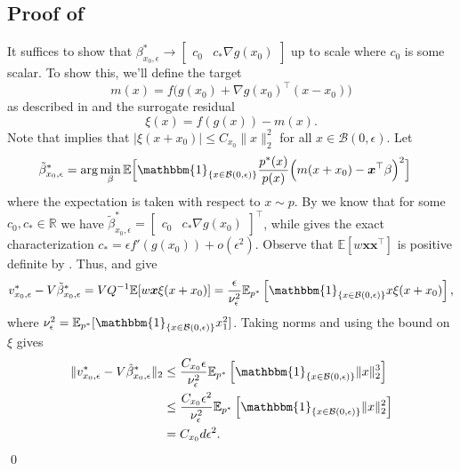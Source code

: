 \documentclass[11pt]{article}
\begin{document}
\begin{appendices}
\subsection{Proof of } \label{sec: proof of population vel prop}
It suffices to show that $\beta^*_{x_0, \epsilon} \rightarrow  \begin{bmatrix}c_0 &  c_*\nabla g(x_0)\end{bmatrix}$ up to scale where $c_0$ is some scalar. To show this, we'll define the  target  
\[m(x) = f\Big(g(x_0) + \nabla g(x_0)^{\top}(x-x_0)\Big)\]
as described in  and the surrogate residual 
\[\xi(x) = f(g(x)) - m(x).\] Note that  implies that $ |\xi(x+x_0)| \leq C_{x_0}\|x\|_2^2$ for all $x\in\mathcal{B}(0,\epsilon)$. Let  
\begin{align}
    \tilde{\beta}^*_{x_0, \epsilon} &= \arg\min_{\beta}\mathbb{E}\Big[\mathbbm{1}_{\{x \in \mathcal{B}(0, \epsilon)\}}\frac{p^*(x)}{p(x)}\Big(m(x+x_0) - \boldsymbol{x}^{\top}\beta\Big)^2\Big] \label{eq: perturbed pop estimator}
\end{align}
where the expectation is taken with respect to $x \sim p$. By  we know that for some $c_0, c_* \in \mathbb{R}$ we have $\tilde{\beta}^*_{x_0, \epsilon}  =  \begin{bmatrix}
    c_0 & c_*\nabla g(x_0)
\end{bmatrix}^{\top}$, while  gives the exact characterization $c_* = \epsilon f'(g(x_0))+ o(\epsilon^2)$. Observe that $\mathbb{E}[w\boldsymbol{x}\boldsymbol{x}^{\top}]$ is positive definite by . Thus,  and  give
\[
    v^*_{x_0,\epsilon}-V\tilde{\beta}_{x_0,\epsilon}^*
    =
    VQ^{-1}\mathbb{E}[w\boldsymbol{x}\xi(x+x_0)]
    =
    \frac{\epsilon}{\nu_\epsilon^2}
    \mathbb{E}_{p^*}\left[
    \mathbbm{1}_{\{x\in\mathcal{B}(0,\epsilon)\}}
    x\xi(x+x_0)
    \right],
\]
where $\nu_\epsilon^2=\mathbb{E}_{p^*}[\mathbbm{1}_{\{x\in\mathcal{B}(0,\epsilon)\}}x_1^2]$. Taking norms and using the bound on $\xi$ gives
\begin{align*}
    \|v^*_{x_0,\epsilon}-V\tilde{\beta}_{x_0,\epsilon}^*\|_2
    &\leq
    \frac{C_{x_0}\epsilon}{\nu_\epsilon^2}
    \mathbb{E}_{p^*}\left[
    \mathbbm{1}_{\{x\in\mathcal{B}(0,\epsilon)\}}
    \|x\|_2^3
    \right] \\
    &\leq
    \frac{C_{x_0}\epsilon^2}{\nu_\epsilon^2}
    \mathbb{E}_{p^*}\left[
    \mathbbm{1}_{\{x\in\mathcal{B}(0,\epsilon)\}}
    \|x\|_2^2
    \right] \\
    &= C_{x_0}d\epsilon^2.
\end{align*}
\qed{}



\end{appendices}
\end{document}
